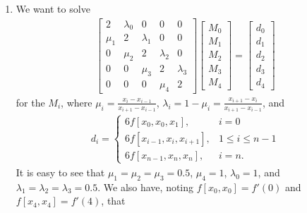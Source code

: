 \documentclass[a4paper,12pt]{article}
\begin{document}
\begin{enumerate}
    \item
        We want to solve
        \begin{align*}
            \left[ \begin{array}{ccccc}
                    2 & \lambda_0 & 0 & 0 & 0 \\
                    \mu_1 & 2 & \lambda_1 & 0 & 0 \\
                    0 & \mu_2 & 2 & \lambda_2 & 0 \\
                    0 & 0 & \mu_3 & 2 & \lambda_3 \\
                    0 & 0 & 0 & \mu_4 & 2
            \end{array} \right]
            \left[ \begin{array}{c}
                    M_0 \\
                    M_1 \\
                    M_2 \\
                    M_3 \\
                    M_4
            \end{array} \right]
            =
            \left[ \begin{array}{c}
                    d_0 \\
                    d_1 \\
                    d_2 \\
                    d_3 \\
                    d_4
            \end{array} \right]
        \end{align*}
        for the $M_i$, where $\mu_i = \frac{x_i - x_{i - 1}}{x_{i + 1} - x_{i - 1}}$, $\lambda_i = 1 - \mu_i = \frac{x_{i + 1} - x_i}{x_{i + 1} - x_{i - 1}}$, and
        \begin{align*}
            d_i = \begin{cases}
                6f[x_0, x_0, x_1], &i = 0 \\
                6f[x_{i - 1}, x_i, x_{i + 1}], &1 \leq i \leq n - 1 \\
                6f[x_{n - 1}, x_n, x_n], &i = n.
            \end{cases}
        \end{align*}
        It is easy to see that $\mu_1 = \mu_2 = \mu_3 = 0.5$, $\mu_4 = 1$, $\lambda_0 = 1$, and $\lambda_1 = \lambda_2 = \lambda_3 = 0.5$. We also have, noting $f[x_0, x_0] = f'(0)$ and $f[x_4, x_4] = f'(4)$, that
        \begin{align*}

\end{align*}
\end{enumerate}
\end{document}
